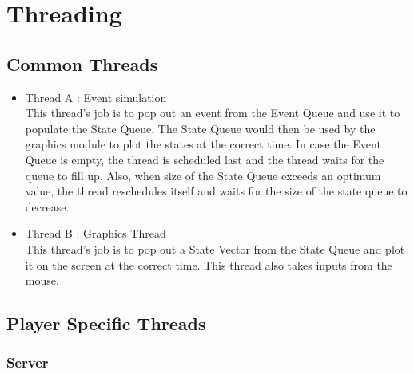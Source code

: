 \documentclass[11pt,a4paper,oneside]{report}
\begin{document}
\section{Threading}


\subsection{Common Threads}
\begin{itemize}

\item{Thread A : Event simulation \\}
This thread's job is to pop out an event from the Event Queue and use it to populate the State Queue. The State Queue would then be used by the graphics module to plot the states at the correct time. In case the Event Queue is empty, the thread is scheduled last and the thread waits for the queue to fill up. Also, when size of the State Queue exceeds an optimum value, the thread reschedules itself and waits for the size of the state queue to decrease. 
\item{Thread B : Graphics Thread \\}
This thread's job is to pop out a State Vector from the State Queue and plot it on the screen at the correct time. This thread also takes inputs from the mouse.

\end{itemize}
\subsection{Player Specific Threads}

\subsubsection{Server}
\end{document}
